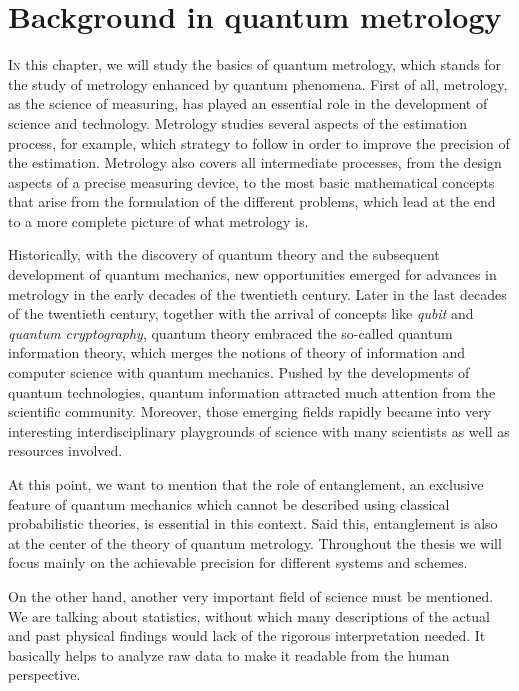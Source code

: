 \section[Backgroud in quantum metrology]
{Background in quantum metrology}



\vspace{0pt}
\lettrine[lines=2, findent=3pt,nindent=0pt]{I}{n} this chapter, we will study the basics of quantum metrology, which stands for the study of metrology enhanced by quantum phenomena.
First of all, metrology, as the science of measuring, has played an essential role in the development of science and technology.
Metrology studies several aspects of the estimation process, for example, which strategy to follow in order to improve the precision of the estimation.
Metrology also covers all intermediate processes, from the design aspects of a precise measuring device, to the most basic mathematical concepts that arise from the formulation of the different problems, which lead at the end to a more complete picture of what metrology is.

Historically, with the discovery of quantum theory and the subsequent development of quantum mechanics, new opportunities emerged for advances in metrology in the early decades of the twentieth century.
Later in the last decades of the twentieth century, together with the arrival of concepts like \emph{qubit} and \emph{quantum cryptography}, quantum theory embraced the so-called quantum information theory, which merges the notions of theory of information and computer science with quantum mechanics.
Pushed by the developments of quantum technologies, quantum information attracted much attention from the scientific community.
Moreover, those emerging fields rapidly became into very interesting interdisciplinary playgrounds of science with many scientists as well as resources involved.

At this point, we want to mention that the role of entanglement, an exclusive feature of quantum mechanics which cannot be described using classical probabilistic theories, is essential in this context.
Said this, entanglement is also at the center of the theory of quantum metrology.
Throughout the thesis we will focus mainly on the achievable precision for different systems and schemes.

On the other hand, another very important field of science must be mentioned.
We are talking about statistics, without which many descriptions of the actual and past physical findings would lack of the rigorous interpretation needed.
It basically helps to analyze raw data to make it readable from the human perspective.

